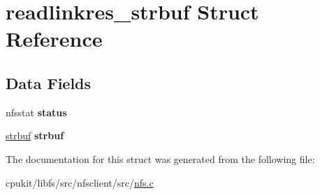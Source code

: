 \hypertarget{structreadlinkres__strbuf}{}\section{readlinkres\+\_\+strbuf Struct Reference}
\label{structreadlinkres__strbuf}
\subsection*{Data Fields}
\begin{DoxyCompactItemize}
\item 
\mbox{\label{structreadlinkres__strbuf_a84247fab53006beff9646eaf4d771355}} 
nfsstat {\bfseries status}
\item 
\mbox{\label{structreadlinkres__strbuf_a2fbf3d4c010c6df2c251738056b095ce}} 
\mbox{\hyperlink{structstrbuf}{strbuf}} {\bfseries strbuf}
\end{DoxyCompactItemize}


The documentation for this struct was generated from the following file\+:\begin{DoxyCompactItemize}
\item 
cpukit/libfs/src/nfsclient/src/\mbox{\hyperlink{nfs_8c}{nfs.\+c}}\end{DoxyCompactItemize}
